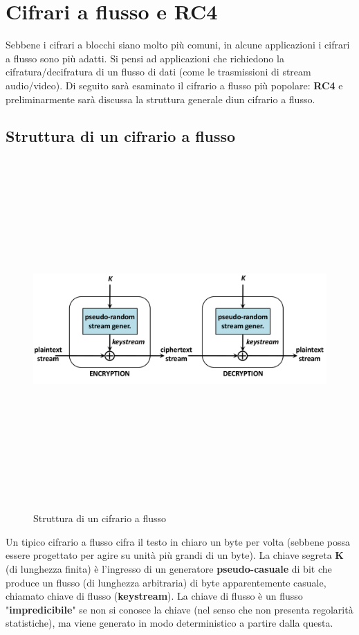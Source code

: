 \section{Cifrari a flusso e RC4}
Sebbene i cifrari a blocchi siano molto più comuni, in alcune applicazioni i cifrari a flusso sono più adatti. Si pensi ad applicazioni che richiedono la cifratura/decifratura di un flusso di dati (come le trasmissioni di stream audio/video). Di seguito sarà esaminato il cifrario a flusso più popolare: \textbf{RC4} e  preliminarmente sarà discussa la struttura generale diun cifrario a flusso.

\subsection{Struttura di un cifrario a flusso}
\begin{figure}[htbp]
	\centering%
	\subfigure%
	{\includegraphics[height=13cm, width=13cm, keepaspectratio]{Immagini/chiave_segreta/flusso_struct.png}}
	\caption{Struttura di un cifrario a flusso \label{fig:flusso_struct}} 	
\end{figure}

Un tipico cifrario a flusso cifra il testo in chiaro un byte per volta (sebbene possa essere progettato per agire su unità più grandi di un byte). La chiave segreta \textbf{K} (di lunghezza finita) è l'ingresso di un generatore \textbf{pseudo-casuale} di bit che produce un flusso (di lunghezza arbitraria) di byte apparentemente casuale, chiamato chiave di flusso (\textbf{keystream}). La chiave di flusso è un flusso "\textbf{impredicibile}" se non si conosce la chiave (nel senso che non presenta regolarità statistiche), ma viene generato in modo deterministico a partire dalla questa. \\

